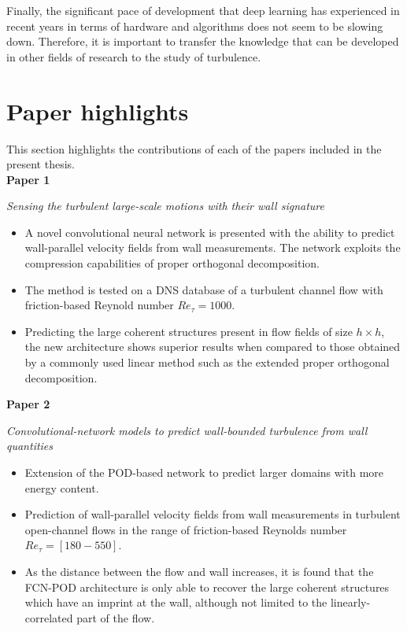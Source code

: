 Finally, the significant pace of development that deep learning has experienced in recent years in terms of hardware and algorithms does not seem to be slowing down.
Therefore, it is important to transfer the knowledge that can be developed in other fields of research to the study of turbulence.

\section{Paper highlights}
This section highlights the contributions of each of the papers included in the present thesis.\\

\noindent\textbf{Paper 1}

\textit{Sensing the turbulent large-scale motions with their wall signature}

\begin{itemize}
  \item A novel convolutional neural network is presented with the ability to predict wall-parallel velocity fields from wall measurements.
  The network exploits the compression capabilities of proper orthogonal decomposition.
  \item The method is tested on a DNS database of a turbulent channel flow with friction-based Reynold number $Re_{\tau}=1000$.
  \item Predicting the large coherent structures present in flow fields of size $h\times h$, the new architecture shows superior results when compared to those obtained by a commonly used linear method such as the extended proper orthogonal decomposition.
\end{itemize}

\noindent\textbf{Paper 2}

\textit{Convolutional-network models to predict wall-bounded turbulence from wall quantities}

\begin{itemize}
  \item Extension of the POD-based network to predict larger domains with more energy content.
  \item Prediction of wall-parallel velocity fields from wall measurements in turbulent open-channel flows in the range of friction-based Reynolds number $Re_{\tau}=[180-550]$.
  \item As the distance between the flow and wall increases, it is found that the FCN-POD architecture is only able to recover the large coherent structures which have an imprint at the wall, although not limited to the linearly-correlated part of the flow.\\
\end{itemize}

